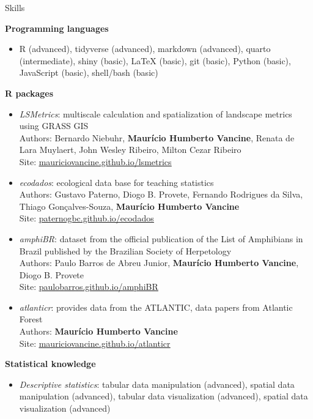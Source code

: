 \documentclass{resume}
\begin{document}
\begin{rSection}{Skills}

{\bf Programming languages}
\begin{itemize}
\item R (advanced), tidyverse (advanced), markdown (advanced), quarto (intermediate), shiny (basic), LaTeX (basic), git (basic), Python (basic), JavaScript (basic), shell/bash (basic)
\end{itemize}

{\bf R packages}
\begin{itemize} 
\item {\it LSMetrics}: multiscale calculation and spatialization of landscape metrics using GRASS GIS
\\ Authors: Bernardo Niebuhr, {\bf Maurício Humberto Vancine}, Renata de Lara Muylaert, John Wesley Ribeiro, Milton Cezar Ribeiro
\\ Site: \href{https://mauriciovancine.github.io/lsmetrics}{\underline{mauriciovancine.github.io/lsmetrics}}

\item {\it ecodados}: ecological data base for teaching statistics
\\ Authors: Gustavo Paterno, Diogo B. Provete, Fernando Rodrigues da Silva, Thiago Gonçalves-Souza, {\bf Maurício Humberto Vancine}
\\ Site: \href{https://paternogbc.github.io/ecodados/}{\underline{paternogbc.github.io/ecodados}}

\item {\it amphiBR}: dataset from the official publication of the List of Amphibians in Brazil published by the Brazilian Society of Herpetology
\\ Authors: Paulo Barros de Abreu Junior, {\bf Maurício Humberto Vancine}, Diogo B. Provete
\\ Site: \href{https://paulobarros.github.io/amphiBR}{\underline{paulobarros.github.io/amphiBR}}

\item {\it atlanticr}: provides data from the ATLANTIC, data papers from Atlantic Forest
\\ Authors: {\bf Maurício Humberto Vancine}
\\ Site: \href{https://mauriciovancine.github.io/atlanticr}{\underline{mauriciovancine.github.io/atlanticr}}
\end{itemize} 

{\bf Statistical knowledge}

\begin{itemize} 
\item {\it Descriptive statistics}: tabular data manipulation (advanced), spatial data manipulation (advanced), tabular data visualization (advanced), spatial data visualization (advanced)


\end{itemize}
\end{rSection}
\end{document}
